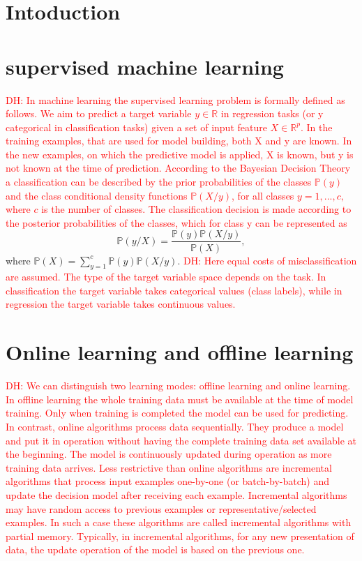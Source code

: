 \documentclass{article}
\newcommand\dhawat[1]{\textcolor{red}{DH: #1}}
\begin{document}
\section{Intoduction} %
\label{sec:Intoduction}





\section{supervised machine learning}
\dhawat{In machine learning the supervised learning problem is formally defined as follows.
    We aim to predict a target variable $y \in \mathbb{R}$ in regression tasks (or y categorical in classification tasks) given a set of input feature $X \in \mathbb{R}^p$.
    In the training examples, that are used for model building, both X and y are known.
    In the new examples, on which the predictive model is applied, X is known, but y is not known at the time of prediction.
    According to the Bayesian Decision Theory a classification can
    be described by the prior probabilities of the classes $\mathbb{P}(y)$ and the class conditional density functions $\mathbb{P}(X/y)$, for all classes $y=1,...,c,$ where $c$ is the number of classes.
    The classification decision is made according to the posterior probabilities of the classes, which for class y can be represented as}
$$\mathbb{P}(y/X) = \frac{\mathbb{P}(y)\mathbb{P}(X/y)}{\mathbb{P}(X)},$$
where $\mathbb{P}(X)= \sum_{y=1}^c \mathbb{P}(y)\mathbb{P}(X/y)$.
\dhawat{Here equal costs of misclassification are assumed.
    The type of the target variable space depends on the task.
    In classification the target variable takes categorical values (class labels), while in regression the target variable takes continuous values.}
\section{Online learning and offline learning}
\dhawat{We can distinguish two learning modes: offline learning and online learning.
    In offline learning the whole training data must be available at the time of model training.
    Only when training is completed the model can be used for predicting. In contrast, online algorithms process data sequentially. They produce a model and put it in operation without having the complete training data set available at the beginning.
    The model is continuously updated during operation as more training data arrives.
    Less restrictive than online algorithms are incremental algorithms that process input examples one-by-one (or batch-by-batch) and update the decision model after receiving each example.
    Incremental algorithms may have random access to previous examples or representative/selected examples.
    In such a case these algorithms are called incremental algorithms with partial memory.
    Typically, in incremental algorithms, for any new presentation of data, the update operation of the model is based on the previous one.}
\end{document}
